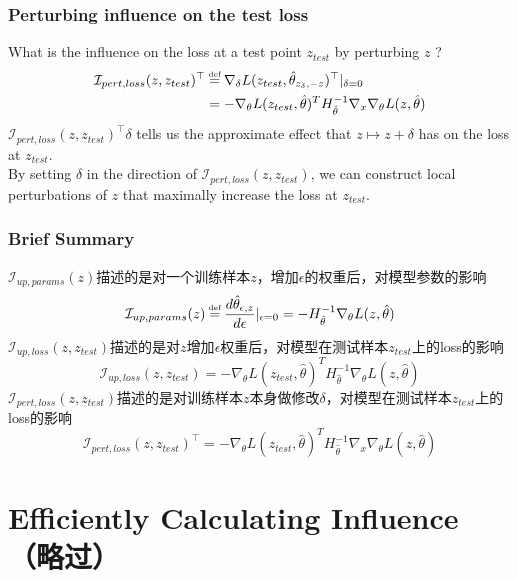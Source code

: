 \documentclass[UTF8]{beamer}
\newcommand\myeq{\stackrel{\mathclap{\tiny\mbox{def}}}{=}}
\begin{document}
\begin{frame}
\frametitle{Perturbing influence on the test loss}
What is the influence on the loss at a test point $z_{test}$ by perturbing $z$ ?
\begin{align}
\mathcal{I}_{pert, loss}(z, z_{test})^\top &\myeq \nabla_{\delta}L(z_{test}, \hat\theta_{z_\delta, -z})^\top\vert_{\delta=0} \nonumber\\
&= -\nabla_{\theta}L(z_{test}, \hat\theta)^TH_{\hat\theta}^{-1}\nabla_x\nabla_{\theta}L(z, \hat\theta)
\end{align}
$\mathcal{I}_{pert, loss}(z, z_{test})^\top\delta$ tells us the approximate effect that $z\mapsto z+\delta$ has on the loss at $z_{test}$.\\
By setting $\delta$ in the direction of $\mathcal{I}_{pert, loss}(z, z_{test})$, we can construct local perturbations of $z$ that maximally increase the loss at $z_{test}$.
\end{frame}
\begin{frame}
\frametitle{Brief Summary}
$\mathcal{I}_{up,params}(z)$描述的是对一个训练样本$z$，增加$\epsilon$的权重后，对模型参数的影响
\begin{equation}
\mathcal{I}_{up,params}(z)\myeq\frac{d\hat{\theta}_{\epsilon, z}}{d\epsilon}\vert_{\epsilon=0} = -H^{-1}_{\hat{\theta}}\nabla_\theta{}L(z, \hat{\theta}) \nonumber
\end{equation}
$\mathcal{I}_{up,loss}(z, z_{test})$描述的是对$z$增加$\epsilon$权重后，对模型在测试样本$z_{test}$上的loss的影响
\begin{equation}
\mathcal{I}_{up,loss}(z, z_{test}) = -\nabla_\theta{}L(z_{test}, \hat\theta)^TH_{\hat\theta}^{-1}\nabla_{\theta}L(z, \hat\theta) \nonumber
\end{equation}
$\mathcal{I}_{pert, loss}(z, z_{test})$描述的是对训练样本$z$本身做修改$\delta$，对模型在测试样本$z_{test}$上的loss的影响
\begin{equation}
\mathcal{I}_{pert, loss}(z, z_{test})^\top = -\nabla_{\theta}L(z_{test}, \hat\theta)^TH_{\hat\theta}^{-1}\nabla_x\nabla_{\theta}L(z, \hat\theta) \nonumber
\end{equation}
\end{frame}
\section{Efficiently Calculating Influence（略过）}
\end{document}
